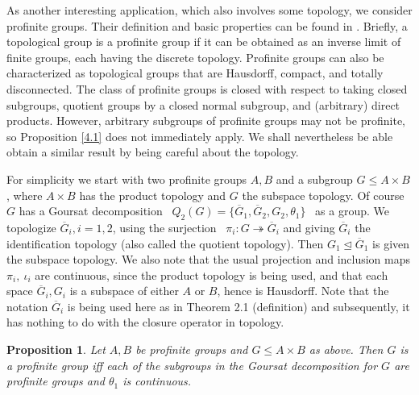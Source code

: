 \documentclass[11pt]{article}
\theoremstyle{change}
\newtheorem{Pro}[Thm]{Proposition}
\newcommand{\<}{\langle}
\renewcommand{\>}{\rangle}
\begin{document}
As another interesting application, which also involves some topology, we consider profinite groups.  Their
 definition and basic properties can be
 found in \cite{Ramakrishnan}.  Briefly, a topological group is a profinite group if it can be obtained as an inverse limit of finite groups, each having the discrete topology. Profinite groups can also be characterized as topological
groups that are Hausdorff, compact, and totally disconnected.  The class of profinite groups is closed with respect to taking closed subgroups, quotient groups by a closed normal subgroup, and (arbitrary) direct products.  However, arbitrary subgroups of profinite groups may not be profinite, so Proposition \ref{4.1} does not immediately apply.  We shall nevertheless be able obtain a similar result by being careful about the topology. 

For simplicity we start with two profinite groups $A, B$ and a subgroup $G \leq A \times B$, where $A\times B$ has the product topology and $G$ the subspace topology. Of course $G$ has a Goursat decomposition \ $Q_2(G) = \{ \overline{G}_1,  \overline{G}_2, G_2, \theta_1 \}$ \ as a group.
We topologize $\overline{G}_i, i=1,2$, using the surjection \ $\pi_i : G \twoheadrightarrow 
\overline{G}_i$ and giving $\overline{G}_i$ the identification topology (also called the quotient topology).
 Then $G_1 \unlhd \overline{G}_1 $ is given the subspace topology. We also note that
the usual projection and inclusion maps $\pi_i, \ \iota_i$ are continuous, since the product topology is being used, and that each space $\overline{G}_i, G_i$ is a subspace of either $A$ or
$B$, hence is Hausdorff. Note that the notation $\overline{G}_i$ is being used here as in
Theorem 2.1 (definition) and subsequently, it has nothing to do with the closure operator in
topology.

  

\begin{Pro}  Let $A, B$ be profinite groups and $G \leq A\times B$ as above.  Then $G$ is a profinite group iff each of the subgroups  in the Goursat decomposition for $G$ are profinite groups and $\theta_1$ is continuous.  

\end{Pro}
\end{document}
